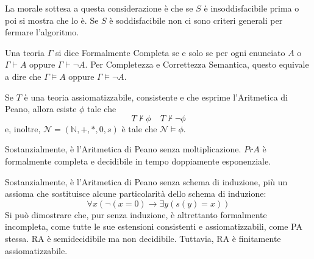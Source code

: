 La morale sottesa a questa considerazione è che se $S$ è insoddisfacibile 
prima o poi si mostra che lo è. Se $S$ è soddisfacibile non ci sono criteri generali 
per fermare l'algoritmo. 


\begin{defi}
        Una teoria $\Gamma$ si dice Formalmente Completa se e solo se per 
        ogni enunciato $A$ o $\Gamma \vdash A$ oppure $\Gamma \vdash \neg A$. 
        Per Completezza e Correttezza Semantica, questo equivale a dire 
        che $\Gamma \models A$ oppure $\Gamma \models \neg A$.
\end{defi}

\begin{teo}
        Se $T$ è una teoria assiomatizzabile, consistente e che esprime 
        l'Aritmetica di Peano, allora esiste $\phi$ tale che 
        $$
        T \nvdash \phi ~~~~~ T \nvdash \neg \phi
        $$
        e, inoltre, $\mathcal{N} = (\mathbb{N}, +, *, 0, s)$ è tale 
        che $\mathcal{N} \models \phi$.
\end{teo}

\begin{defi}
        Sostanzialmente, è l'Aritmetica di Peano senza moltiplicazione. 
        $PrA$ è formalmente completa e decidibile in tempo doppiamente esponenziale.
\end{defi}

\begin{defi}
        Sostanzialmente, è l'Aritmetica di Peano senza schema di induzione, 
        più un assioma che sostituisce alcune particolarità dello 
        schema di induzione: 
        $$
        \forall x (\neg (x= 0) \rightarrow \exists y (s(y) = x))
        $$
        Si può dimostrare che, pur senza induzione, è altrettanto formalmente 
        incompleta, come tutte le sue estensioni consistenti e assiomatizzabili, 
        come PA stessa. RA è semidecidibile ma non decidibile. 
        Tuttavia, RA è finitamente assiomatizzabile.
\end{defi}

